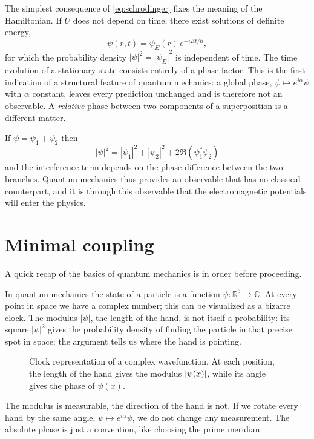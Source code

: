 The simplest consequence of \cref{eq:schrodinger}
fixes the meaning of the Hamiltonian. If \(U\) does not depend on time,
there exist solutions of definite energy,
\vspace{-3pt}
\[
	\psi(r,t) = \psi_E(r)\, e^{-iEt/\hbar},
\]
for which the probability density \(|\psi|^2 = |\psi_E|^2\) is independent of
time. The time evolution of a stationary state consists entirely of a phase
factor. This is the first indication of a structural feature of quantum
mechanics: a global phase, \(\psi \longmapsto e^{i \alpha}\psi\) with
\(\alpha\) constant, leaves every prediction unchanged and is therefore not
an observable. A \emph{relative} phase between two components of a
superposition is a different matter.

\enlargethispage{0.7cm}
If \(\psi = \psi_1 + \psi_2\) then
\[
	|\psi|^2 = |\psi_1|^2 + |\psi_2|^2 + 2 \Re \!
	\left(
	\psi_1^* \psi_2
	\right)
\]
and the interference term depends on the phase difference between the two
branches. Quantum mechanics thus provides an observable that has no classical
counterpart, and it is through this observable that the electromagnetic
potentials will enter the physics.


\section{Minimal coupling}

A quick recap of the basics of quantum mechanics is in
order before proceeding.

In quantum mechanics the state of a particle is a function
\(\psi \colon \mathbb{R}^3 \to \mathbb{C}\). At every point in space
we have a complex number; this can be visualized as a bizarre clock. The modulus
\(|\psi|\), the length of the hand, is not itself a probability:
its square \(|\psi|^2\) gives the probability density of finding the particle in that precise
spot in space; the argument tells us where the hand is pointing.

\begin{figure}[H]
	\centering
	
	\caption{Clock representation of a complex wavefunction. At each position,
		the length of the hand gives the modulus \(\left|\psi(x)\right|\), while its angle
		gives the phase of \(\psi(x)\).}
	\label{fig:wavefunction-clock}
\end{figure}
\vspace{-11pt}
The modulus is measurable, the direction of the hand is not. If we rotate every hand by the same
angle, \(\psi \longmapsto e^{i\alpha} \psi\), we do not change any measurement.
The absolute phase is just a convention, like choosing the prime meridian.

